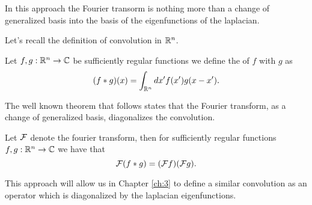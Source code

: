 \documentclass[../2.tex]{subfiles}
\begin{document}
In this approach the Fourier transorm is nothing more than a change of generalized basis into the basis of the eigenfunctions of the laplacian.

Let's recall the definition of convolution in $\mathbb{R}^n$.

\begin{defn}
    Let $f,g : \mathbb{R}^n \to \mathbb{C}$ be sufficiently regular functions we define the  of $f$ with $g$ as
    \[ (f * g)(x) = \int_{\mathbb{R}^n} dx' f(x')g(x-x').\]
\end{defn}

The well known theorem that follows states that the Fourier transform, as a change of generalized basis, diagonalizes the convolution.

\begin{thm}
    Let $\mathcal{F}$ denote the fourier transform, then for sufficiently regular functions $f,g : \mathbb{R}^n \to \mathbb{C}$ we have that
    \[ \mathcal{F}(f * g) = (\mathcal{F}f)(\mathcal{F}g).\]
\end{thm}

This approach will allow us in Chapter \ref{ch:3} to define a similar convolution as an operator which is diagonalized by the laplacian eigenfunctions.
    
\end{document}
